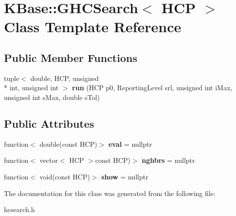 \hypertarget{class_k_base_1_1_g_h_c_search}{\section{K\-Base\-:\-:G\-H\-C\-Search$<$ H\-C\-P $>$ Class Template Reference}
\label{class_k_base_1_1_g_h_c_search}
}
\subsection*{Public Member Functions}
\begin{DoxyCompactItemize}
\item 
\hypertarget{class_k_base_1_1_g_h_c_search_a69f34435e5a5e2c63439bf8e04160a90}{tuple$<$ double, H\-C\-P, unsigned \\*
int, unsigned int $>$ {\bfseries run} (H\-C\-P p0, Reporting\-Level srl, unsigned int i\-Max, unsigned int s\-Max, double s\-Tol)}\label{class_k_base_1_1_g_h_c_search_a69f34435e5a5e2c63439bf8e04160a90}

\end{DoxyCompactItemize}
\subsection*{Public Attributes}
\begin{DoxyCompactItemize}
\item 
\hypertarget{class_k_base_1_1_g_h_c_search_a2fd914dfbcf61a1226c09cec50634f83}{function$<$ double(const H\-C\-P)$>$ {\bfseries eval} = nullptr}\label{class_k_base_1_1_g_h_c_search_a2fd914dfbcf61a1226c09cec50634f83}

\item 
\hypertarget{class_k_base_1_1_g_h_c_search_a8d2f1b18ccc7203763d4ddc7cc7243af}{function$<$ vector$<$ H\-C\-P $>$const H\-C\-P)$>$ {\bfseries nghbrs} = nullptr}\label{class_k_base_1_1_g_h_c_search_a8d2f1b18ccc7203763d4ddc7cc7243af}

\item 
\hypertarget{class_k_base_1_1_g_h_c_search_ac3332b5acb47013165ae3e218f8b658a}{function$<$ void(const H\-C\-P)$>$ {\bfseries show} = nullptr}\label{class_k_base_1_1_g_h_c_search_ac3332b5acb47013165ae3e218f8b658a}

\end{DoxyCompactItemize}


The documentation for this class was generated from the following file\-:\begin{DoxyCompactItemize}
\item 
hcsearch.\-h\end{DoxyCompactItemize}
